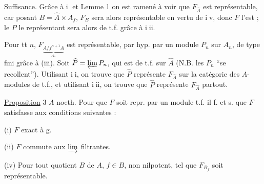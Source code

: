 Suffisance. Grâce à \textcircled{\scriptsize i} et Lemme 1 on est ramené à voir que $F_{\widehat A}$ est représentable, car posant $B=\widehat A\times A_f$, $F_B$ sera alors représentable en vertu de \textcircled{\scriptsize iv}, donc $F$ l'est ; le $P$ le représentant sera alors de t.f. grâce à \textcircled{\scriptsize iii}.

Pour tt $n$, $F_{\underbrace{A/f^{n+1}A}_{A_n}}$ est représentable, par hyp.  par un module $P_n$ sur $A_n$,  de type fini grâce à (iii). Soit $\widehat P=\varprojlim P_n$, qui est de t.f. sur $\widehat A$ (N.B. les $P_n$ ``se recollent'').  Utilisant \textcircled{\scriptsize ii}, on trouve que $\widehat P$ représente $F_{\widehat A}$ sur la catégorie des $A$-modules de t.f., et utilisant \textcircled{\scriptsize iii}, on trouve que $\widehat P$ représente $F_{\widehat A}$ partout.

\uline{Proposition} 3 \quad $A$ noeth. Pour que $F$ soit repr. par un module  t.f. il f. et s. que $F$ satisfasse aux conditions suivantes :

(i) $F$ exact à g.

(ii) $F$ commute aux $\varinjlim$ filtrantes.


(iv) Pour tout quotient  $B$ de $A$,   $f\in B$, non nilpotent, tel que $F_{B_f}$ soit représentable.

